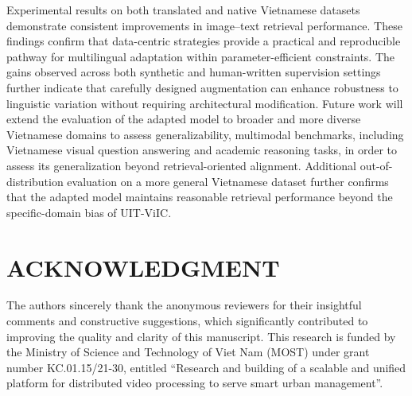 Experimental results on both translated and native Vietnamese datasets demonstrate consistent improvements in image--text retrieval performance. These findings confirm that data-centric strategies provide a practical and reproducible pathway for multilingual adaptation within parameter-efficient constraints. The gains observed across both synthetic and human-written supervision settings further indicate that carefully designed augmentation can enhance robustness to linguistic variation without requiring architectural modification. Future work will extend the evaluation of the adapted model to broader and more diverse Vietnamese domains to assess generalizability, multimodal benchmarks, including Vietnamese visual question answering and academic reasoning tasks, in order to assess its generalization beyond retrieval-oriented alignment.  Additional out-of-distribution evaluation on a more general Vietnamese dataset further confirms that the adapted model maintains reasonable retrieval performance beyond the specific-domain bias of UIT-ViIC.




\section*{ACKNOWLEDGMENT}


The authors sincerely thank the anonymous reviewers for their insightful comments and constructive suggestions, which significantly contributed to improving the quality and clarity of this manuscript. This research is funded by the Ministry of Science and Technology of Viet Nam (MOST) under grant number KC.01.15/21-30, entitled “Research and building of a scalable and unified platform for distributed video processing to serve smart urban management”.



%


